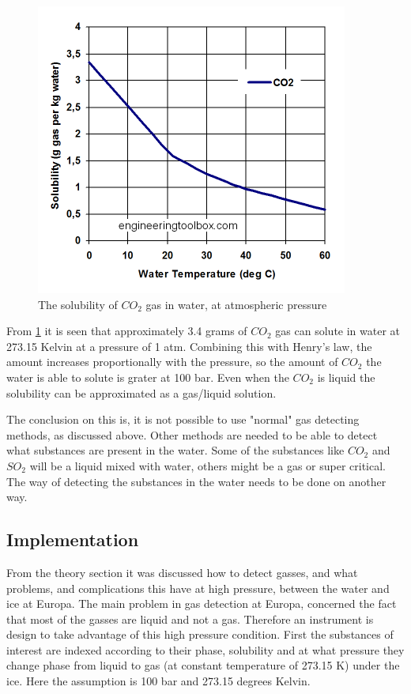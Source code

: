\begin{figure}[htb]
  \centering
  \includegraphics[scale=0.4]{figures/GasDetectionAgge/CO2Solubility}
  \caption{The solubility of $CO_2$ gas in water, at atmospheric pressure\cite{SolubilityOfGasesInWater}}
  \label{fig:SolubilityofCO2}
\end{figure}

From \ref{fig:SolubilityofCO2} it is seen that approximately 3.4 grams of $CO_2$ gas can solute in water at 273.15 Kelvin at a pressure of 1 atm. Combining this with Henry's law, the amount increases proportionally with the pressure, so the amount of $CO_2$ the water is able to solute is grater at 100 bar. Even when the $CO_2$ is liquid the solubility can be approximated as a gas/liquid solution\cite{SolubilityExplained}.

The conclusion on this is, it is not possible to use "normal" gas detecting methods, as discussed above. Other methods are needed to be able to detect what substances are present in the water. Some of the substances like $CO_2$ and $SO_2$ will be a liquid mixed with water, others might be a gas or super critical. The way of detecting the substances in the water needs to be done on another way.

\subsection{Implementation}

From the theory section it was discussed how to detect gasses, and what problems, and complications this have at high pressure, between the water and ice at Europa. The main problem in gas detection at Europa, concerned the fact that most of the gasses are liquid and not a gas. Therefore an instrument is design to take advantage of this high pressure condition. First the substances of interest are indexed according to their phase, solubility and at what pressure they change phase from liquid to gas (at constant temperature of 273.15 K) under the ice. Here the assumption is 100 bar and 273.15 degrees Kelvin.

